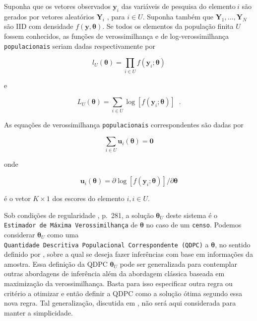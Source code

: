 \documentclass[]{book}
\theoremstyle{definition}
\theoremstyle{definition}
\theoremstyle{definition}
\theoremstyle{remark}
\begin{document}
Suponha que os vetores observados \(\mathbf{y}_{i}\) das variáveis de
pesquisa do elemento\(\ i\) são gerados por vetores aleatórios
\(\mathbf{Y}_{i}\) , para \(i\in U\). Suponha também que
\(\mathbf{Y}_{1},\ldots ,\mathbf{Y}_{N}\) são IID com densidade
\(f\left( \mathbf{y},\mathbf{\theta }\right)\). Se todos os elementos da
população finita \(U\) fossem conhecidos, as funções de verossimilhança
e de log-verossimilhança \texttt{populacionais} seriam dadas
respectivamente por

\begin{equation}
l_{U}\left( \mathbf{\theta }\right) =\prod\limits_{i\in U}f\left( \mathbf{y}
_{i};\mathbf{\theta }\right)  
\label{eq:modpar3}
\end{equation}

e

\begin{equation}
L_{U}\left( \mathbf{\theta }\right) =\sum_{i\in U}\log \left[ f\left( 
\mathbf{y}_{i};\mathbf{\theta }\right) \right] \;\;.  
\label{eq:modpar4}
\end{equation}

As equações de verossimilhança \texttt{populacionais} correspondentes
são dadas por

\begin{equation}
\sum_{i\in U}\mathbf{u}_{i}\left( \mathbf{\theta }\right) =\mathbf{0}
\label{eq:modpar5}
\end{equation}

onde

\begin{equation}
\mathbf{u}_{i}\left( \mathbf{\theta }\right) =\partial \log \left[ f\left( 
\mathbf{y}_{i};\mathbf{\theta }\right) \right] /\partial \mathbf{\theta }
\label{eq:modpar6}
\end{equation}

é o vetor \(K\times 1\) dos escores do elemento \(i,i\in U\).

Sob condições de regularidade \citep{cox}, p.~281, a solução
\(\mathbf{\theta }_{U}\) deste sistema é o
\texttt{Estimador\ de\ Máxima\ Verossimilhança} de \(\mathbf{\theta }\)
no caso de um \texttt{censo}. Podemos considerar
\(\mathbf{\theta }_{U}\) como uma
\texttt{Quantidade\ Descritiva\ Populacional\ Correspondente\ (QDPC)} a
\(\mathbf{\theta }\), no sentido definido por \citep{Pfeff}, sobre a
qual se deseja fazer inferências com base em informações da amostra.
Essa definição da QDPC \(\mathbf{\theta }_{U}\) pode ser generalizada
para contemplar outras abordagens de inferência além da abordagem
clássica baseada em maximização da verossimilhança. Basta para isso
especificar outra regra ou critério a otimizar e então definir a QDPC
como a solução ótima segundo essa nova regra. Tal generalização,
discutida em \citep{Pfeff}, não será aqui considerada para manter a
simplicidade.
\end{document}
